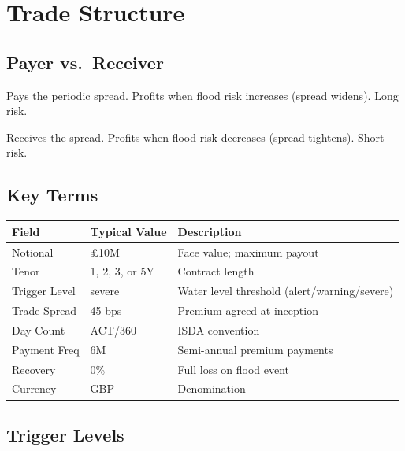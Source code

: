 \documentclass[11pt,a4paper]{article}
\begin{document}
\section{Trade Structure}

\subsection{Payer vs.\ Receiver}

\begin{description}[leftmargin=2em]
  \item[Payer (protection buyer)] Pays the periodic spread.  Profits
        when flood risk increases (spread widens).  Long risk.
  \item[Receiver (protection seller)] Receives the spread.  Profits
        when flood risk decreases (spread tightens).  Short risk.
\end{description}

\subsection{Key Terms}

\begin{center}
\begin{tabular}{llp{7cm}}
\toprule
\textbf{Field} & \textbf{Typical Value} & \textbf{Description} \\
\midrule
Notional      & \pounds10M  & Face value; maximum payout \\
Tenor         & 1, 2, 3, or 5Y & Contract length \\
Trigger Level & severe     & Water level threshold (alert/warning/severe) \\
Trade Spread  & 45 bps     & Premium agreed at inception \\
Day Count     & ACT/360    & ISDA convention \\
Payment Freq  & 6M         & Semi-annual premium payments \\
Recovery      & 0\%        & Full loss on flood event \\
Currency      & GBP        & Denomination \\
\bottomrule
\end{tabular}
\end{center}

\subsection{Trigger Levels}
\end{document}

